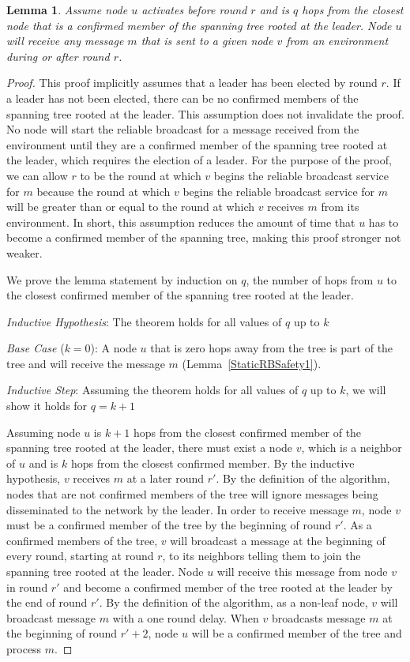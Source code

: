\documentclass[english]{article}
\newtheorem{lemma}[theorem]{Lemma}
\begin{document}
\begin{lemma}
\label{RBSafety1ByInduction}
  Assume node $u$ activates before round $r$ and is $q$ hops from the closest node that is a confirmed member of the spanning tree rooted at the leader. Node $u$ will receive any message $m$ that is sent to a given node $v$ from an environment during or after round $r$.
\end{lemma}
\begin{proof} This proof implicitly assumes that a leader has been elected by round $r$. If a leader has not been elected, there can be no confirmed members of the spanning tree rooted at the leader. This assumption does not invalidate the proof. No node will start the reliable broadcast for a message received from the environment until they are a confirmed member of the spanning tree rooted at the leader, which requires the election of a leader. For the purpose of the proof, we can allow $r$ to be the round at which $v$ begins the reliable broadcast service for $m$ because the round at which $v$ begins the reliable broadcast service for $m$ will be greater than or equal to the round at which $v$ receives $m$ from its environment. In short, this assumption reduces the amount of time that $u$ has to become a confirmed member of the spanning tree, making this proof stronger not weaker.


We prove the lemma statement by induction on $q$, the number of hops from $u$ to the closest confirmed member of the spanning tree rooted at the leader.


\noindent \textit{Inductive Hypothesis}: The theorem holds for all values of $q$ up to $k$

\noindent \textit{Base Case} ($k=0$): A node $u$ that is zero hops away from the tree is part of the tree and will receive the message $m$ (Lemma~\ref{StaticRBSafety1}).

\noindent \textit{Inductive Step}: Assuming the theorem holds for all values of $q$ up to $k$, we will show it holds for $q = k+1$

Assuming node $u$ is $k+1$ hops from the closest confirmed member of the spanning tree rooted at the leader, there must exist a node $v$, which is a neighbor of $u$ and is $k$ hops from the closest confirmed member. By the inductive hypothesis, $v$ receives $m$ at a later round $r'$. By the definition of the algorithm, nodes that are not confirmed members of the tree will ignore messages being disseminated to the network by the leader. In order to receive message $m$, node $v$ must be a confirmed member of the tree by the beginning of round $r'$. As a confirmed members of the tree, $v$ will broadcast a message at the beginning of every round, starting at round $r$, to its neighbors telling them to join the spanning tree rooted at the leader. Node $u$ will receive this message from node $v$ in round $r'$ and become a confirmed member of the tree rooted at the leader by the end of round $r'$. By the definition of the algorithm, as a non-leaf node, $v$ will broadcast message $m$ with a one round delay. When $v$ broadcasts message $m$ at the beginning of round $r'+2$, node $u$ will be a confirmed member of the tree and process $m$.

\end{proof}
\end{document}

